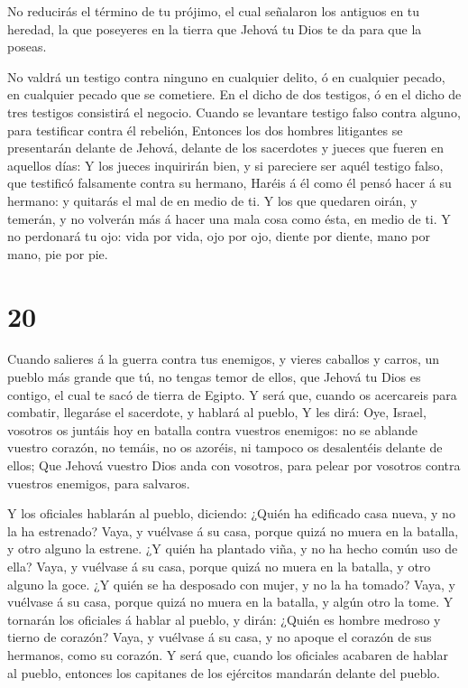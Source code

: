  No reducirás el término de tu prójimo, el cual señalaron
los antiguos en tu heredad, la que poseyeres en la tierra que Jehová tu
Dios te da para que la poseas.

 No valdrá un testigo contra ninguno en cualquier delito, ó
en cualquier pecado, en cualquier pecado que se cometiere. En el dicho
de dos testigos, ó en el dicho de tres testigos consistirá el negocio.
 Cuando se levantare testigo falso contra alguno, para
testificar contra él rebelión,  Entonces los dos hombres
litigantes se presentarán delante de Jehová, delante de los sacerdotes y
jueces que fueren en aquellos días:  Y los jueces
inquirirán bien, y si pareciere ser aquél testigo falso, que testificó
falsamente contra su hermano,  Haréis á él como él pensó
hacer á su hermano: y quitarás el mal de en medio de ti.  Y
los que quedaren oirán, y temerán, y no volverán más á hacer una mala
cosa como ésta, en medio de ti.  Y no perdonará tu ojo:
vida por vida, ojo por ojo, diente por diente, mano por mano, pie por
pie.

\hypertarget{section-19}{%
\section{20}\label{section-19}}

 Cuando salieres á la guerra contra tus enemigos, y vieres
caballos y carros, un pueblo más grande que tú, no tengas temor de
ellos, que Jehová tu Dios es contigo, el cual te sacó de tierra de
Egipto.  Y será que, cuando os acercareis para combatir,
llegaráse el sacerdote, y hablará al pueblo,  Y les dirá:
Oye, Israel, vosotros os juntáis hoy en batalla contra vuestros
enemigos: no se ablande vuestro corazón, no temáis, no os azoréis, ni
tampoco os desalentéis delante de ellos;  Que Jehová vuestro
Dios anda con vosotros, para pelear por vosotros contra vuestros
enemigos, para salvaros.

 Y los oficiales hablarán al pueblo, diciendo: ¿Quién ha
edificado casa nueva, y no la ha estrenado? Vaya, y vuélvase á su casa,
porque quizá no muera en la batalla, y otro alguno la estrene.
 ¿Y quién ha plantado viña, y no ha hecho común uso de ella?
Vaya, y vuélvase á su casa, porque quizá no muera en la batalla, y otro
alguno la goce.  ¿Y quién se ha desposado con mujer, y no la
ha tomado? Vaya, y vuélvase á su casa, porque quizá no muera en la
batalla, y algún otro la tome.  Y tornarán los oficiales á
hablar al pueblo, y dirán: ¿Quién es hombre medroso y tierno de corazón?
Vaya, y vuélvase á su casa, y no apoque el corazón de sus hermanos, como
su corazón.  Y será que, cuando los oficiales acabaren de
hablar al pueblo, entonces los capitanes de los ejércitos mandarán
delante del pueblo.

